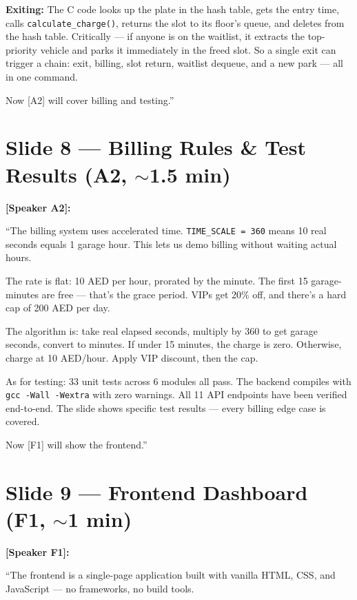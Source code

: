 \documentclass[12pt, a4paper]{article}
\begin{document}
\textbf{Exiting:} The C code looks up the plate in the hash table, gets the entry time, calls \texttt{calculate\_charge()}, returns the slot to its floor's queue, and deletes from the hash table. Critically --- if anyone is on the waitlist, it extracts the top-priority vehicle and parks it immediately in the freed slot. So a single exit can trigger a chain: exit, billing, slot return, waitlist dequeue, and a new park --- all in one command.

Now [A2] will cover billing and testing.''

\section{Slide 8 --- Billing Rules \& Test Results (A2, $\sim$1.5 min)}

\textbf{[Speaker A2]:}

``The billing system uses accelerated time. \texttt{TIME\_SCALE = 360} means 10 real seconds equals 1 garage hour. This lets us demo billing without waiting actual hours.

The rate is flat: 10 AED per hour, prorated by the minute. The first 15 garage-minutes are free --- that's the grace period. VIPs get 20\% off, and there's a hard cap of 200 AED per day.

The algorithm is: take real elapsed seconds, multiply by 360 to get garage seconds, convert to minutes. If under 15 minutes, the charge is zero. Otherwise, charge at 10 AED/hour. Apply VIP discount, then the cap.

As for testing: 33 unit tests across 6 modules all pass. The backend compiles with \texttt{gcc -Wall -Wextra} with zero warnings. All 11 API endpoints have been verified end-to-end. The slide shows specific test results --- every billing edge case is covered.

Now [F1] will show the frontend.''

\section{Slide 9 --- Frontend Dashboard (F1, $\sim$1 min)}

\textbf{[Speaker F1]:}

``The frontend is a single-page application built with vanilla HTML, CSS, and JavaScript --- no frameworks, no build tools.
\end{document}
